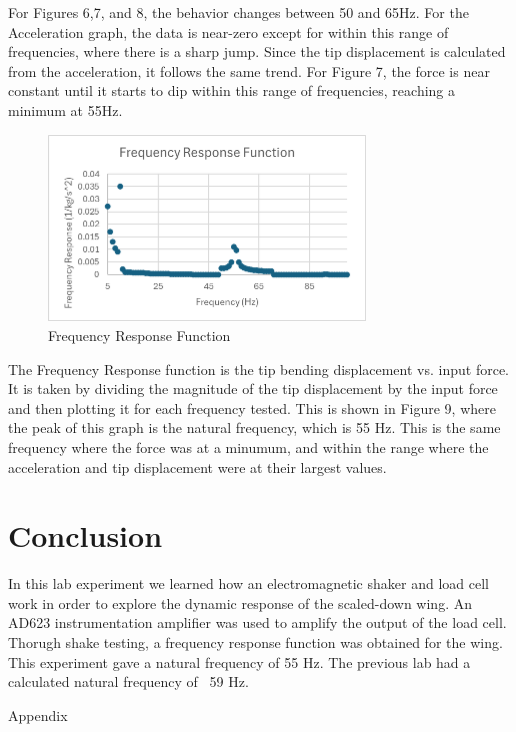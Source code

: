 \documentclass{article}
\begin{document}
For Figures 6,7, and 8, the behavior changes between 50 and 65Hz.  For the Acceleration graph, the data is near-zero except for within this range of frequencies, where there is a sharp jump.  Since the tip displacement is calculated from the acceleration, it follows the same trend.  For Figure 7, the force is near constant until it starts to dip within this range of frequencies, reaching a minimum at 55Hz.  
\begin{figure}[H]
    \centering
    \includegraphics[width=0.75\textwidth]{lab7images/freqresponsefunc.png}
    \caption{Frequency Response Function}
    \label{fig:freqresponsefunc}
\end{figure}
The Frequency Response function is the tip bending displacement vs. input force.  It is taken by dividing the magnitude of the tip displacement by the input force and then plotting it for each frequency tested. 
This is shown in Figure 9, where the peak of this graph is the natural frequency, which is 55 Hz.  This is the same frequency where the force was at a minumum, and within the range where the acceleration and tip displacement were at their largest values.  
 
\section{Conclusion}
In this lab experiment we learned how an electromagnetic shaker and load cell work in order to explore the dynamic response of the scaled-down wing.  An AD623 instrumentation amplifier was used to amplify the output of the load cell.  Thorugh shake testing, a frequency response function was obtained for the wing. This experiment gave a natural frequency of 55 Hz.  The previous lab had a calculated natural frequency of ~59 Hz.  


\newpage
\thispagestyle{empty}  %
\begin{center}
	\vspace*{\fill}
	{\Huge Appendix}
	\vspace*{\fill}
\end{center}
\end{document}
